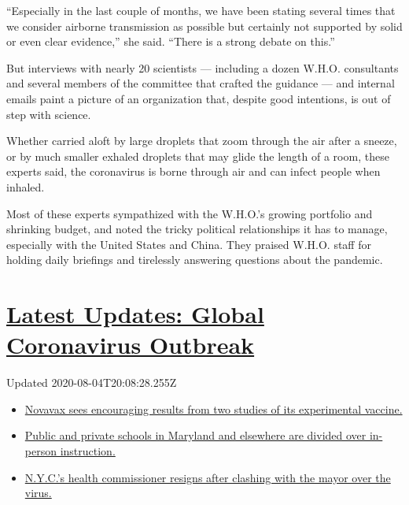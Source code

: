 ``Especially in the last couple of months, we have been stating several
times that we consider airborne transmission as possible but certainly
not supported by solid or even clear evidence,'' she said. ``There is a
strong debate on this.''

But interviews with nearly 20 scientists --- including a dozen W.H.O.
consultants and several members of the committee that crafted the
guidance --- and internal emails paint a picture of an organization
that, despite good intentions, is out of step with science.

Whether carried aloft by large droplets that zoom through the air after
a sneeze, or by much smaller exhaled droplets that may glide the length
of a room, these experts said, the coronavirus is borne through air and
can infect people when inhaled.

Most of these experts sympathized with the W.H.O.'s growing portfolio
and shrinking budget, and noted the tricky political relationships it
has to manage, especially with the United States and China. They praised
W.H.O. staff for holding daily briefings and tirelessly answering
questions about the pandemic.

\hypertarget{latest-updates-global-coronavirus-outbreak}{%
\section{\texorpdfstring{\href{https://www.nytimes.com/2020/08/04/world/coronavirus-cases.html?action=click\&pgtype=Article\&state=default\&region=MAIN_CONTENT_1\&context=storylines_live_updates}{Latest
Updates: Global Coronavirus
Outbreak}}{Latest Updates: Global Coronavirus Outbreak}}\label{latest-updates-global-coronavirus-outbreak}}

Updated 2020-08-04T20:08:28.255Z

\begin{itemize}
\tightlist
\item
  \href{https://www.nytimes.com/2020/08/04/world/coronavirus-cases.html?action=click\&pgtype=Article\&state=default\&region=MAIN_CONTENT_1\&context=storylines_live_updates\#link-1228a480}{Novavax
  sees encouraging results from two studies of its experimental
  vaccine.}
\item
  \href{https://www.nytimes.com/2020/08/04/world/coronavirus-cases.html?action=click\&pgtype=Article\&state=default\&region=MAIN_CONTENT_1\&context=storylines_live_updates\#link-4825b93}{Public
  and private schools in Maryland and elsewhere are divided over
  in-person instruction.}
\item
  \href{https://www.nytimes.com/2020/08/04/world/coronavirus-cases.html?action=click\&pgtype=Article\&state=default\&region=MAIN_CONTENT_1\&context=storylines_live_updates\#link-4d1eafa8}{N.Y.C.'s
  health commissioner resigns after clashing with the mayor over the
  virus.}
\end{itemize}

